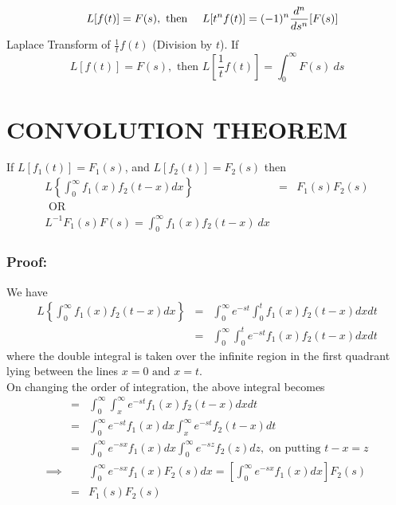 \documentclass[12pt]{report}
\begin{document}
\begin{equation}
\quad L[f(t)]=F(s), \mbox{ then } \\
\quad L[t^nf(t)]=(-1)^n \frac{d^n}{ds^n}[F(s)]
\end{equation}
Laplace Transform of $\frac{1}{t}f(t)$ (Division by $t$). If
\begin{equation}
L[f(t)]=F(s), \mbox{ then } L \left[\frac{1}{t}f(t)\right]=\int_0^\infty F(s)~ds
\end{equation}

\section{CONVOLUTION THEOREM}
If $L[f_1(t)]=F_1(s)$, and $L[f_2(t)]=F_2(s)$ then
\begin{eqnarray}
L \left\{\int_0^\infty f_1(x)f_2(t-x)dx\right\}&=&F_1(s) F_2(s)\nonumber \\
\mbox{ OR }\nonumber \\
L^{-1}F_1(s)F(s)=\int_0^\infty f_1(x)f_2(t-x)~dx\nonumber
\end{eqnarray}

\subsubsection{Proof:}
We have
\begin{eqnarray}
L \left \{\int_0^\infty f_1(x)f_2(t-x)dx \right\} &= &\int_0^\infty e^{-st} \int_0^t f_1(x)f_2(t-x)dx dt \nonumber\\
&= & \int_0^\infty \int_0^t e^{-st}f_1(x)f_2(t-x)dx dt\nonumber
\end{eqnarray}
where the double integral is taken over the infinite region in the first quadrant lying between the lines $x=0 \mbox{ and } x=t$.\\
On changing the order of integration, the above integral becomes 
\begin{eqnarray}
&=&\int_0^\infty \int_x^\infty e^{-st}f_1(x)f_2(t-x)dxdt\nonumber \\
&= &\int_0^\infty e^{-st}f_1(x)dx \int_x^\infty e^{-st}f_2(t-x)dt\nonumber \\
&= & \int_0^\infty e^{-sx}f_1(x)dx \int_0^\infty e^{-sz}f_2(z)dz, \mbox{ on putting } t-x=z \nonumber\\
\implies & &\int_0^\infty e^{-sx}f_1(x)F_2(s)dx = \left[\int_0^\infty e^{-sx}f_1(x)dx \right]F_2(s)\nonumber \\
& =& F_1(s) F_2(s)
\end{eqnarray}
\end{document}
